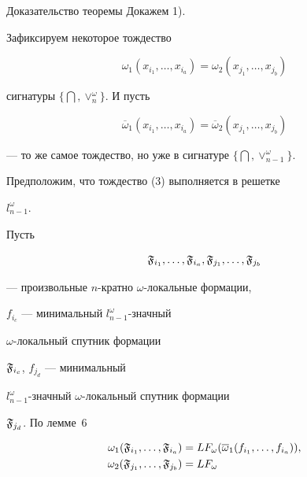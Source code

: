 \begin{pf*}{Доказательство теоремы} Докажем 1).


Зафиксируем некоторое тождество


\begin{equation}


\omega_1(x_{i_1},\dotsc,x_{i_a})=\omega_2(x_{j_1},\dotsc,x_{j_b})


\end{equation}


сигнатуры $\{\bigcap,\vee_{n}^{\omega}\}$. И пусть


\begin{equation}


\overline{\omega}_1(x_{i_1},\dotsc,


x_{i_a})=\overline{\omega}_2(x_{j_1},\dotsc,x_{j_b})


\end{equation}


--- то же самое тождество, но уже в сигнатуре $\{\bigcap,


\vee_{n-1}^{\omega}\}$.





Предположим, что тождество (3) выполняется в решетке


$l_{n-1}^{\omega}$.


Пусть


$$


\frak{F}_{i_1},\dotsc,\frak{F}_{i_a},\frak{F}_{j_1},\dotsc,\frak{F}_{j_b}


$$


--- произвольные $n$-кратно $\omega$-локальные формации,


$f_{i_c}$ --- минимальный $l^{\omega}_{n-1}$-значный


$\omega$-ло\-каль\-ный спутник формации


$\frak{F}_{i_c}$, $f_{j_d}$ --- минимальный


$l^{\omega}_{n-1}$-значный $\omega$-локальный спутник формации


$\frak{F}_{j_d}$. По лемме~6


\begin{align*}


\omega_1(\frak{F}_{i_1},\dotsc,\frak{F}_{i_a})&=LF_{\omega}


(\overline{\omega}_1(f_{i_1},\dotsc,f_{i_a})), \\


\omega_2(\frak{F}_{j_1},\dotsc,\frak{F}_{j_b})&=LF_{\omega}



\end{align*}
\end{pf*}
